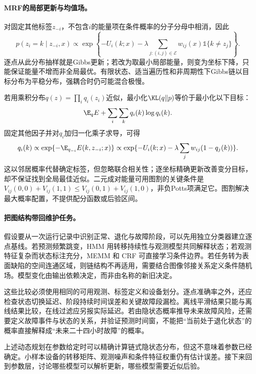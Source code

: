 \paragraph{MRF的局部更新与均值场。}
对固定其他标签$z_{-i}$，不包含$i$的能量项在条件概率的分子分母中相消，因此
\begin{equation}
 p(z_i=k\mid z_{-i},x)\propto
 \exp\left\{-U_i(k;x)-\lambda\sum_{j:(i,j)\in\mathcal E}w_{ij}(x)\mathbb 1\{k\ne z_j\}\right\}.
\end{equation}
逐点从此分布抽样就是Gibbs更新；若改为取最小局部能量，则变为坐标下降，只能保证能量不增而非全局最优。有限状态、适当遍历性和非周期性下Gibbs链以目标分布为平稳分布，强耦合时仍可能混合极慢。

若用乘积分布$q(z)=\prod_iq_i(z_i)$近似，最小化$\KL(q\|p)$等价于最小化以下目标：
\begin{equation}
 \E_qE+\sum_i\sum_kq_i(k)\log q_i(k).
\end{equation}
固定其他因子并对$q_i$加归一化乘子求导，可得
\begin{equation}
 q_i(k)\propto\exp\{-\E_{q_{-i}}E(k,z_{-i};x)\}
 \propto\exp\{-U_i(k;x)-\lambda\sum_jw_{ij}(1-q_j(k))\}.
\end{equation}
这以邻居概率代替确定标签，但忽略联合相关性；逐坐标精确更新改善变分目标，却不保证找到全局最佳近似。二元成对能量可用图割的关键条件是$V_{ij}(0,0)+V_{ij}(1,1)\leq V_{ij}(0,1)+V_{ij}(1,0)$，非负Potts项满足它。图割解决最大概率配置，不提供配分函数或后验区间。

\paragraph{把图结构带回维护任务。}
假设要从一次运行记录中识别正常、退化与故障阶段，可以先用独立分类器建立逐点基线。若预测频繁跳变，HMM 用转移持续性与观测模型共同解释状态；若观测特征复杂而状态标注充分，MEMM 和 CRF 可直接学习条件边界。若任务转为表面缺陷的空间连通区域，则链结构不再适用，需要结合图像邻接关系定义条件随机场。模型变化由输出依赖决定，而非由名称的新旧决定。

这些比较必须使用相同的可用观测、标签定义和设备划分。逐点准确率之外，还应检查状态切换延迟、阶段持续时间误差和关键故障段漏检。离线平滑结果只能与离线结果比较，在线过滤应另报实际延迟。若由隐状态概率推导未来故障风险，还需要定义故障事件与状态的关系，并验证预测时间窗，不能把“当前处于退化状态”的概率直接解释成“未来二十四小时故障”的概率。

上述动态规划在参数给定时可以精确计算链式隐状态分布，但这不意味着参数已经确定。小样本设备的转移矩阵、观测噪声和条件特征权重仍有估计误差。接下来回到参数层，讨论哪些模型可以解析更新，哪些模型需要近似后验。

